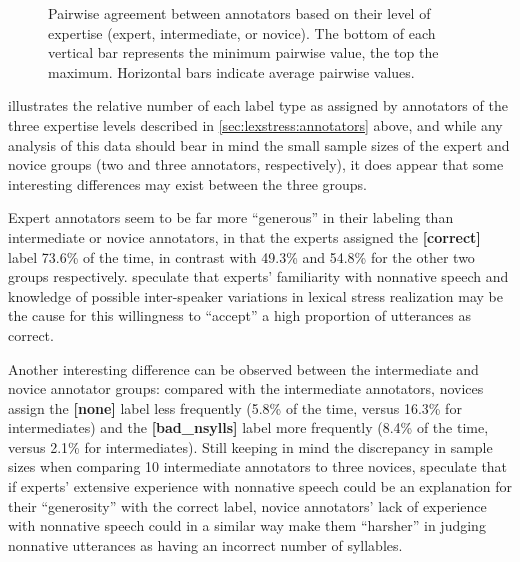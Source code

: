 \begin{figure}[htb]
			\caption[Pairwise agreement statistics by annotator expertise]{Pairwise agreement between annotators based on their level of expertise (expert, intermediate, or novice). The bottom of each vertical bar represents the minimum pairwise value, the top the maximum. Horizontal bars indicate average pairwise values.}
			\label{fig:agree:expertise}
		\end{figure}
		
			 illustrates the relative number of each label type as assigned by annotators of the three expertise levels described in \cref{sec:lexstress:annotators} above, and while any analysis of this data should bear in mind the small sample sizes of the expert and novice groups (two and three annotators, respectively), it does appear that some interesting differences may exist between the three groups. 
			
			Expert annotators seem to be far more ``generous'' in their labeling than intermediate or novice annotators, in that the experts assigned the \textbf{[correct]} label 73.6\% of the time, in contrast with 49.3\% and 54.8\% for the other two groups respectively.  speculate that experts' familiarity with nonnative speech and knowledge of possible inter-speaker variations in lexical stress realization may be the cause for this willingness to ``accept'' a high proportion of utterances as correct. 
			
			Another interesting difference can be observed between the intermediate and novice annotator groups: compared with the intermediate annotators, novices assign the \textbf{[none]} label less frequently (5.8\% of the time, versus 16.3\% for intermediates) and the \textbf{[bad\_nsylls]} label more frequently (8.4\% of the time, versus 2.1\% for intermediates). Still keeping in mind the discrepancy in sample sizes when comparing 10 intermediate annotators to three novices,  speculate that if experts' extensive experience with nonnative speech could be an explanation for their ``generosity'' with the correct label, novice annotators' lack of experience with nonnative speech could in a similar way make them ``harsher'' in judging nonnative utterances as having an incorrect number of syllables. 
			
			
